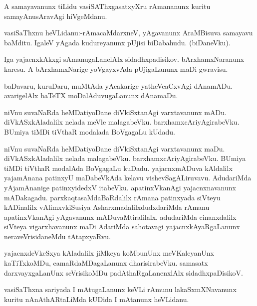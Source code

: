 \documentclass{article}
\begin{document}
\begin{mn}%
A samayavanunx tiLidu vasiSAThxgasatxyXru rAmananunx kuritu samayAnusAravAgi hiVgeMdanu.
\end{mn}

\begin{mn}%
vasiSaThxnu heVLidanu:-rAmacaMdarxneV, yAgavanunx AraMBisuva samayavu baMditu. IgaleV yAgada 
kudureyanunx pUjisi biDabahudu. (biDaneVku).
\end{mn}

\begin{mn}%
Iga yajacnxkAkxgi sAmanugaLanelAlx sidadhxpadisikov. bArxhamxNaranunx karesu. A 
bArxhamxNarige yoVgayxvAda pUjigaLanunx maDi gwravisu.
\end{mn}

\begin{mn}%
baDavaru, kuruDaru, muMtAda yAcakarige yatheVcaCxvAgi dAnamADu. avarigelAlx baTeTX 
moDalAduvugaLanunx dAnamaDu.
\end{mn}

\begin{mn}%
niVnu suvaNaRda heMDatiyoDane diVkiSxtanAgi varxtavanunx mADu. diVkASxkAladalilx nelada 
meVle malagabeVku. barxhamxcAriyAgirabeVku. BUmiya tiMDi tiVthaR modalada BoVgagaLu kUdadu.
\end{mn}

\begin{mn}%
niVnu suvaNaRda heMDatiyoDane diVkiSxtanAgi varxtavanunx maDu. diVkASxkAladalilx nelada 
malagabeVku. barxhamxcAriyAgirabeVku. BUmiya tiMDi tiVthaR modalAda BoVgagaLu kuDadu. 
yajacnxmADuva kAldalilx yajamAnana patinxyU maDabeVkAda kelavu vishevSagALiruvavu. 
AdudariMda yAjamAnanige patinxyidedxV itabeVku. apatinxVkanAgi yajacnxnavanunx mADakagadu. 
parxkaqtasaMdaBaRdalilx rAmana patinxyada siVteyu kADinalilx vAlimxvkiSusiya 
AsharxmadalilxdudxdariMda rAmanu apatinxVkanAgi yAgavanunx mADuvaMtiralilalx. adudariMda 
cinanxdalilx siVteya vigarxhavanunx maDi AdariMda sahotavagi yajacnxkAyaRgaLanunx 
neraveVrisidaneMdu tAtapxyaRvu.
\end{mn}

\begin{mn}%
yajacnxdeVkeSxya kAladalilx jiMkeya koMbunUnx meVKaleyanUnx kaTiTxkoMDu, 
camaRdaMDagaLanunx dharisirabeVku. samasatx darxvayxgaLanUnx seVrisikoMDu 
padAthaRgaLanenxlAlx sidadhxpaDisikoV.
\end{mn}

\begin{mn}%
vasiSaThxna sariyada I mAtugaLanunx keVLi rAmunu lakaSxmXNavanunx kuritu nAnAthARtaLiMda 
kUDida I mAtanunx heVLidanu.
\end{mn}
\end{document}
